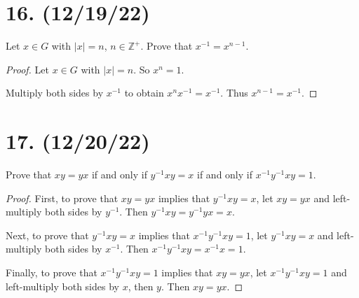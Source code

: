 \documentclass{article}
\begin{document}
\section*{16. (12/19/22)}

Let $x \in G$ with $|x| = n$, $n \in \mathbb{Z}^+$. Prove that $x^{-1} = x^{n - 1}$.

\begin{proof}
      Let $x \in G$ with $|x| = n$. So $x^n = 1$.

      Multiply both sides by $x^{-1}$ to obtain $x^n x^{-1} = x^{-1}$. Thus $x^{n - 1} = x^{-1}$.
\end{proof}

\section*{17. (12/20/22)}

Prove that $xy = yx$ if and only if $y^{-1} xy = x$ if and only if $x^{-1} y^{-1} xy = 1$.

\begin{proof}
      First, to prove that $xy = yx$ implies that $y^{-1} xy = x$, let $xy = yx$ and left-multiply both sides by $y^{-1}$. Then $y^{-1} xy = y^{-1} yx = x$.

      Next, to prove that $y^{-1} xy = x$ implies that $x^{-1} y^{-1} xy = 1$, let $y^{-1} xy = x$ and left-multiply both sides by $x^{-1}$. Then $x^{-1} y^{-1} xy = x^{-1} x = 1$.

      Finally, to prove that $x^{-1} y^{-1} xy = 1$ implies that $xy = yx$, let $x^{-1} y^{-1} xy = 1$ and left-multiply both sides by $x$, then $y$. Then $xy = yx$.
\end{proof}
\end{document}
